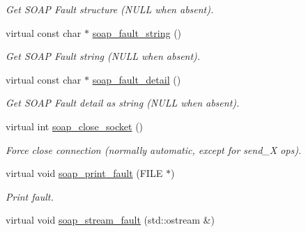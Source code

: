 \begin{DoxyCompactItemize}
\begin{DoxyCompactList}\small\item\em Get SOAP Fault structure (NULL when absent). \item\end{DoxyCompactList}\item 
\hypertarget{classPASSPortBindingProxy_a4db8cbfb1804724e3ee08cf934bc12ee}{
virtual const char $\ast$ \hyperlink{classPASSPortBindingProxy_a4db8cbfb1804724e3ee08cf934bc12ee}{soap\_\-fault\_\-string} ()}
\label{classPASSPortBindingProxy_a4db8cbfb1804724e3ee08cf934bc12ee}

\begin{DoxyCompactList}\small\item\em Get SOAP Fault string (NULL when absent). \item\end{DoxyCompactList}\item 
\hypertarget{classPASSPortBindingProxy_ae7b23174b53ddafac55147c2f8466624}{
virtual const char $\ast$ \hyperlink{classPASSPortBindingProxy_ae7b23174b53ddafac55147c2f8466624}{soap\_\-fault\_\-detail} ()}
\label{classPASSPortBindingProxy_ae7b23174b53ddafac55147c2f8466624}

\begin{DoxyCompactList}\small\item\em Get SOAP Fault detail as string (NULL when absent). \item\end{DoxyCompactList}\item 
\hypertarget{classPASSPortBindingProxy_a68c11be7e277703a69c029ce3d4b90c7}{
virtual int \hyperlink{classPASSPortBindingProxy_a68c11be7e277703a69c029ce3d4b90c7}{soap\_\-close\_\-socket} ()}
\label{classPASSPortBindingProxy_a68c11be7e277703a69c029ce3d4b90c7}

\begin{DoxyCompactList}\small\item\em Force close connection (normally automatic, except for send\_\-X ops). \item\end{DoxyCompactList}\item 
\hypertarget{classPASSPortBindingProxy_a339bb176d8c179c8c38ade242198bc64}{
virtual void \hyperlink{classPASSPortBindingProxy_a339bb176d8c179c8c38ade242198bc64}{soap\_\-print\_\-fault} (FILE $\ast$)}
\label{classPASSPortBindingProxy_a339bb176d8c179c8c38ade242198bc64}

\begin{DoxyCompactList}\small\item\em Print fault. \item\end{DoxyCompactList}\item 
\hypertarget{classPASSPortBindingProxy_a54fd6c3311b6f96a19f46a4f8a5f3e8a}{
virtual void \hyperlink{classPASSPortBindingProxy_a54fd6c3311b6f96a19f46a4f8a5f3e8a}{soap\_\-stream\_\-fault} (std::ostream \&)}
\label{classPASSPortBindingProxy_a54fd6c3311b6f96a19f46a4f8a5f3e8a}


\end{DoxyCompactItemize}
